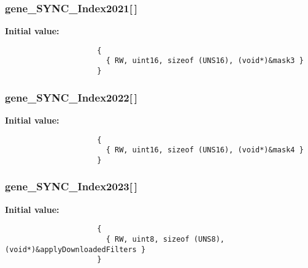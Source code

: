 \subsubsection{ {\bf gene\_\-SYNC\_\-Index2021}[$\,$]}\label{objdict_8c_65772a251cdad36ef5be85cac5d77173}


\textbf{Initial value:}

\begin{Code}\begin{verbatim} 
                     {
                       { RW, uint16, sizeof (UNS16), (void*)&mask3 }
                     }
\end{verbatim}\end{Code}
\subsubsection{ {\bf gene\_\-SYNC\_\-Index2022}[$\,$]}\label{objdict_8c_bafa94f2ba14bd6cc972db9980850389}


\textbf{Initial value:}

\begin{Code}\begin{verbatim} 
                     {
                       { RW, uint16, sizeof (UNS16), (void*)&mask4 }
                     }
\end{verbatim}\end{Code}
\subsubsection{ {\bf gene\_\-SYNC\_\-Index2023}[$\,$]}\label{objdict_8c_3795735adfc95609094bbce5106449e7}


\textbf{Initial value:}

\begin{Code}\begin{verbatim} 
                     {
                       { RW, uint8, sizeof (UNS8), (void*)&applyDownloadedFilters }
                     }
\end{verbatim}\end{Code}
